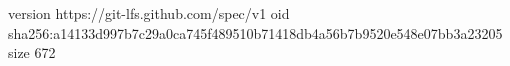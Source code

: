 version https://git-lfs.github.com/spec/v1
oid sha256:a14133d997b7c29a0ca745f489510b71418db4a56b7b9520e548e07bb3a23205
size 672
